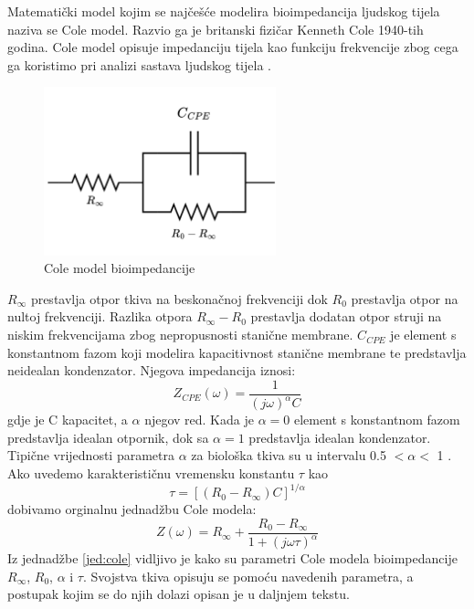 \documentclass[../diplomski_rad.tex]{subfiles}
\begin{document}
Matematički model kojim se najčešće modelira bioimpedancija ljudskog tijela naziva se Cole model. 
Razvio ga je britanski fizičar Kenneth Cole 1940-tih godina. 
Cole model opisuje impedanciju tijela kao funkciju frekvencije zbog cega ga koristimo pri analizi sastava ljudskog tijela \cite{Freeborn2021}.
\begin{figure}[htb]
    \centering
    \includegraphics[width=0.6\textwidth]{Figures/cole_model.png} 
    \caption{Cole model bioimpedancije}
    \label{slk:cole_model}
\end{figure}
$R_{\infty}$ prestavlja otpor tkiva na beskonačnoj frekvenciji dok $R_{0}$ prestavlja otpor na nultoj frekvenciji. 
Razlika otpora $R_{\infty}-R_{0}$ prestavlja dodatan otpor struji na niskim frekvencijama zbog nepropusnosti stanične membrane. 
$C_{CPE}$ je element s konstantnom fazom koji modelira kapacitivnost stanične membrane 
te predstavlja neidealan kondenzator. Njegova impedancija iznosi: 
\begin{equation}
    \label{jed:cpe}
    Z_{CPE}(\omega) = \frac{1}{(j\omega)^{\alpha}C}
\end{equation} 
gdje je C kapacitet, a $\alpha$ njegov red. Kada je $\alpha = 0$ element s konstantnom fazom predstavlja idealan otpornik, 
dok sa $\alpha = 1$ predstavlja idealan kondenzator. 
Tipične vrijednosti parametra $\alpha$ za biološka tkiva su u intervalu 0.5 $< \alpha <$ 1 \cite{Freeborn2021}.
Ako uvedemo karakterističnu vremensku konstantu $\tau$ kao
\begin{equation}
    \label{jed:time_const}
    \tau = [(R_{0}-R_{\infty})C]^{1/\alpha}
\end{equation}
dobivamo orginalnu jednadžbu Cole modela: 
\begin{equation}
    \label{jed:cole}
    Z(\omega) = R_{\infty}+\frac{R_{0}-R_{\infty}}{1+(j\omega\tau)^{\alpha}} 
\end{equation} 
Iz jednadžbe \ref{jed:cole} vidljivo je kako su parametri Cole modela bioimpedancije 
$R_{\infty}$, $R_{0}$, $\alpha$ i $\tau$. 
Svojstva tkiva opisuju se pomoću navedenih parametra, a postupak kojim se do njih dolazi opisan je u daljnjem tekstu.
\end{document}
